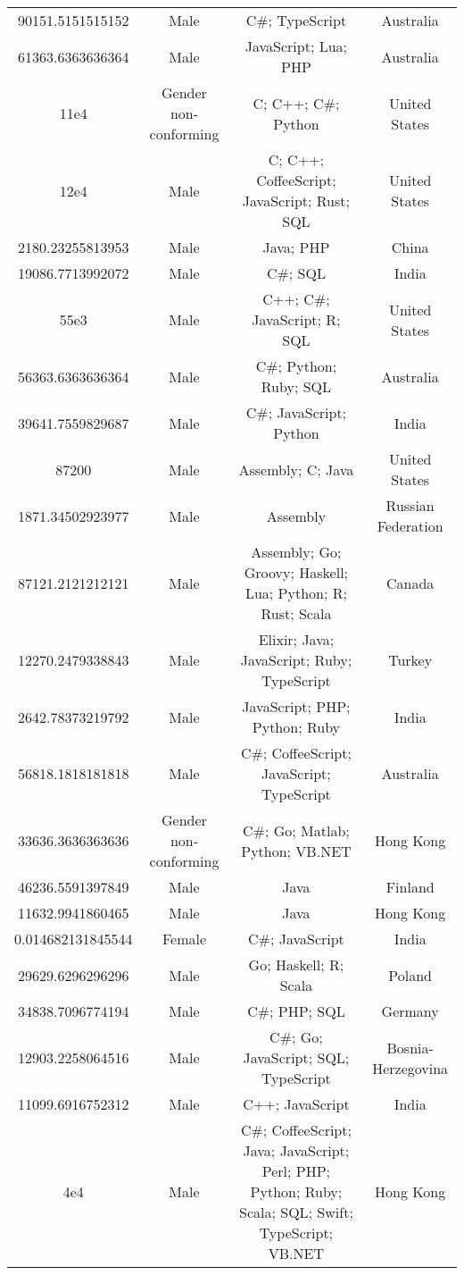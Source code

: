 \begin{center}
\begin{tabular}{ |c|c|c|c| }
90151.5151515152  &  Male  &  C\#; TypeScript  &  Australia  \\ 
61363.6363636364  &  Male  &  JavaScript; Lua; PHP  &  Australia  \\ 
11e4  &  Gender non-conforming  &  C; C++; C\#; Python  &  United States  \\ 
12e4  &  Male  &  C; C++; CoffeeScript; JavaScript; Rust; SQL  &  United States  \\ 
2180.23255813953  &  Male  &  Java; PHP  &  China  \\ 
19086.7713992072  &  Male  &  C\#; SQL  &  India  \\ 
55e3  &  Male  &  C++; C\#; JavaScript; R; SQL  &  United States  \\ 
56363.6363636364  &  Male  &  C\#; Python; Ruby; SQL  &  Australia  \\ 
39641.7559829687  &  Male  &  C\#; JavaScript; Python  &  India  \\ 
87200  &  Male  &  Assembly; C; Java  &  United States  \\ 
1871.34502923977  &  Male  &  Assembly  &  Russian Federation  \\ 
87121.2121212121  &  Male  &  Assembly; Go; Groovy; Haskell; Lua; Python; R; Rust; Scala  &  Canada  \\ 
12270.2479338843  &  Male  &  Elixir; Java; JavaScript; Ruby; TypeScript  &  Turkey  \\ 
2642.78373219792  &  Male  &  JavaScript; PHP; Python; Ruby  &  India  \\ 
56818.1818181818  &  Male  &  C\#; CoffeeScript; JavaScript; TypeScript  &  Australia  \\ 
33636.3636363636  &  Gender non-conforming  &  C\#; Go; Matlab; Python; VB.NET  &  Hong Kong  \\ 
46236.5591397849  &  Male  &  Java  &  Finland  \\ 
11632.9941860465  &  Male  &  Java  &  Hong Kong  \\ 
0.014682131845544  &  Female  &  C\#; JavaScript  &  India  \\ 
29629.6296296296  &  Male  &  Go; Haskell; R; Scala  &  Poland  \\ 
34838.7096774194  &  Male  &  C\#; PHP; SQL  &  Germany  \\ 
12903.2258064516  &  Male  &  C\#; Go; JavaScript; SQL; TypeScript  &  Bosnia-Herzegovina  \\ 
11099.6916752312  &  Male  &  C++; JavaScript  &  India  \\ 
4e4  &  Male  &  C\#; CoffeeScript; Java; JavaScript; Perl; PHP; Python; Ruby; Scala; SQL; Swift; TypeScript; VB.NET  &  Hong Kong  \\ 

\end{tabular}
\end{center}
